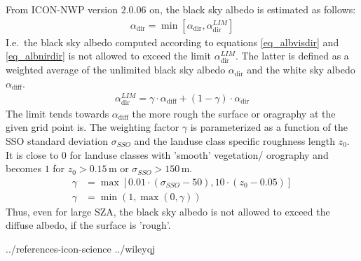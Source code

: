 \documentclass[a4paper,11pt]{article}
\begin{document}
From ICON-NWP version $2.0.06$ on, the black sky albedo is estimated as follows:
\begin{align}
 \alpha_{\mathrm{dir}} = \min\left[\alpha_{\mathrm{dir}},\alpha_{\mathrm{dir}}^{LIM}\right]
\end{align}
I.e.\ the black sky albedo computed according to equations \eqref{eq_albvisdir} and \eqref{eq_albnirdir} is not allowed to exceed the 
limit $\alpha_{\mathrm{dir}}^{LIM}$. The latter is defined as a weighted average of the unlimited black sky albedo $\alpha_{\mathrm{dir}}$ 
and the white sky albedo $\alpha_{\mathrm{diff}}$.
\begin{align}
 \alpha_{\mathrm{dir}}^{LIM} = \gamma \cdot \alpha_{\mathrm{diff}} + (1-\gamma)\cdot \alpha_{\mathrm{dir}}
\end{align}
The limit tends towards $\alpha_{\mathrm{diff}}$ the more rough the surface or oragraphy at the given grid point is. 
The weighting factor $\gamma$ is parameterized as a function of the SSO standard deviation $\sigma_{SSO}$ and 
the landuse class specific roughness length $z_{0}$. It is close to $0$ for landuse classes with 'smooth' vegetation/ orography 
and becomes $1$ for $z_{0}>0.15\,\mathrm{m}$ or $\sigma_{SSO}>150\,\mathrm{m}$.
\begin{align}
 \gamma &= \max\left[0.01\cdot (\sigma_{SSO}-50),10\cdot(z_{0}-0.05)\right]\\
 \gamma &= \min(1,\max(0,\gamma))
\end{align}
Thus, even for large SZA, the black sky albedo is not allowed to exceed the diffuse albedo, if the surface is 'rough'.



% 


 {../references-icon-science}
 {../wileyqj} %
\end{document}
